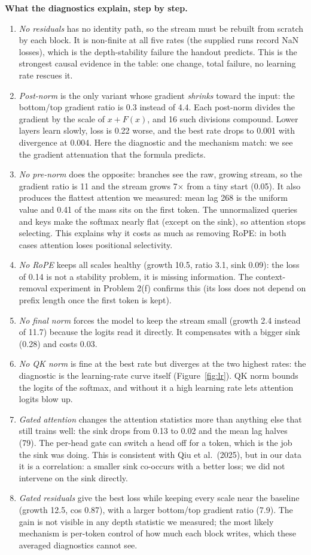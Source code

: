 \documentclass[10pt,letterpaper]{article}
\begin{document}
\textbf{What the diagnostics explain, step by step.}
\begin{enumerate}
\item \emph{No residuals} has no identity path, so the stream must be rebuilt from scratch by each block. It is non-finite at all five rates (the supplied runs record NaN losses), which is the depth-stability failure the handout predicts. This is the strongest causal evidence in the table: one change, total failure, no learning rate rescues it.
\item \emph{Post-norm} is the only variant whose gradient \emph{shrinks} toward the input: the bottom/top gradient ratio is 0.3 instead of 4.4. Each post-norm divides the gradient by the scale of $x + F(x)$, and 16 such divisions compound. Lower layers learn slowly, loss is 0.22 worse, and the best rate drops to 0.001 with divergence at 0.004. Here the diagnostic and the mechanism match: we see the gradient attenuation that the formula predicts.
\item \emph{No pre-norm} does the opposite: branches see the raw, growing stream, so the gradient ratio is 11 and the stream grows 7$\times$ from a tiny start (0.05). It also produces the flattest attention we measured: mean lag 268 is the uniform value and 0.41 of the mass sits on the first token. The unnormalized queries and keys make the softmax nearly flat (except on the sink), so attention stops selecting. This explains why it costs as much as removing RoPE: in both cases attention loses positional selectivity.
\item \emph{No RoPE} keeps all scales healthy (growth 10.5, ratio 3.1, sink 0.09): the loss of 0.14 is not a stability problem, it is missing information. The context-removal experiment in Problem 2(f) confirms this (its loss does not depend on prefix length once the first token is kept).
\item \emph{No final norm} forces the model to keep the stream small (growth 2.4 instead of 11.7) because the logits read it directly. It compensates with a bigger sink (0.28) and costs 0.03.
\item \emph{No QK norm} is fine at the best rate but diverges at the two highest rates: the diagnostic is the learning-rate curve itself (Figure~\ref{fig:lr}). QK norm bounds the logits of the softmax, and without it a high learning rate lets attention logits blow up.
\item \emph{Gated attention} changes the attention statistics more than anything else that still trains well: the sink drops from 0.13 to 0.02 and the mean lag halves (79). The per-head gate can switch a head off for a token, which is the job the sink was doing. This is consistent with Qiu et al.\ (2025), but in our data it is a correlation: a smaller sink co-occurs with a better loss; we did not intervene on the sink directly.
\item \emph{Gated residuals} give the best loss while keeping every scale near the baseline (growth 12.5, cos 0.87), with a larger bottom/top gradient ratio (7.9). The gain is not visible in any depth statistic we measured; the most likely mechanism is per-token control of how much each block writes, which these averaged diagnostics cannot see.
\end{enumerate}
\end{document}
